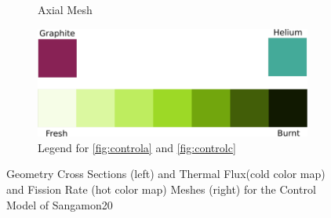 \begin{figure}[H]
\begin{subfigure}{0.45\textwidth}
  \caption{Axial Mesh}
  \label{fig:controld}
\end{subfigure}
%
\begin{subfigure}{\textwidth}
\centering
\includegraphics[width=0.6\linewidth]{figures/geom-legend}
\caption{Legend for \ref{fig:controla} and \ref{fig:controlc}}
\label{fig:geom-legend1}
\end{subfigure}

\caption{Geometry Cross Sections (left) and Thermal Flux(cold color map) and Fission Rate (hot color map) Meshes (right) for the Control Model of Sangamon20}
\label{fig:controlmain}
\end{figure}